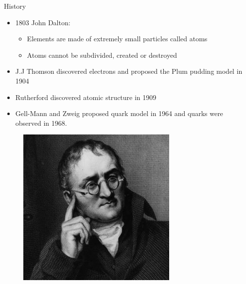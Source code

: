 \documentclass{beamer}
\begin{document}
{\begin{frame}{History}
    \begin{itemize}
        \item 1803 John Dalton:
            \begin{itemize}
                \item Elements are made of extremely small particles called atoms
                \item Atoms cannot be subdivided, created or destroyed
            \end{itemize}
        \item J.J Thomson discovered electrons and proposed the Plum pudding model in 1904
        \item Rutherford discovered atomic structure in 1909
        \item Gell-Mann and Zweig proposed quark model in 1964 and quarks were observed in 1968.
    \end{itemize}
    \begin{figure}
        \includegraphics[scale=0.26]{figures/Dalton.jpg}

\end{figure}
\end{frame}}
\end{document}
